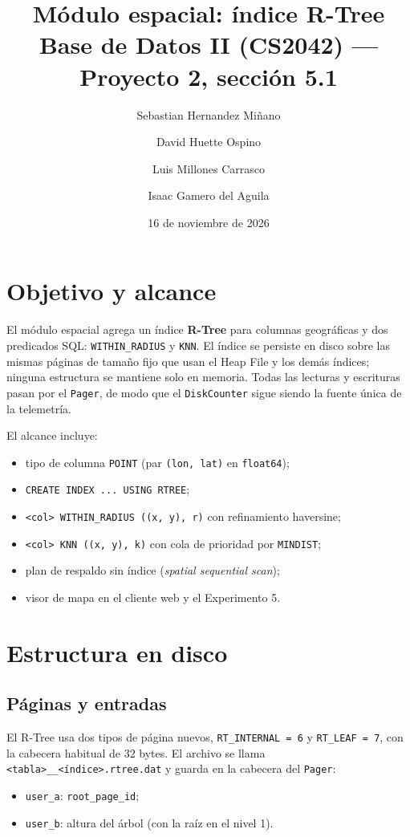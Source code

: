 \documentclass[11pt,a4paper]{article}
\title{Módulo espacial: índice R-Tree\\
\large Base de Datos II (CS2042) --- Proyecto 2, sección 5.1}
\author{Sebastian Hernandez Miñano \and David Huette Ospino \and
Luis Millones Carrasco \and Isaac Gamero del Aguila}
\date{16 de noviembre de 2026}
\newcommand{\code}[1]{\texttt{#1}}
\begin{document}
\maketitle

\section{Objetivo y alcance}

El módulo espacial agrega un índice \textbf{R-Tree} para columnas geográficas y dos
predicados SQL: \code{WITHIN\_RADIUS} y \code{KNN}. El índice se persiste en disco
sobre las mismas páginas de tamaño fijo que usan el Heap File y los demás índices;
ninguna estructura se mantiene solo en memoria. Todas las lecturas y escrituras
pasan por el \code{Pager}, de modo que el \code{DiskCounter} sigue siendo la fuente
única de la telemetría.

El alcance incluye:

\begin{itemize}
  \item tipo de columna \code{POINT} (par \code{(lon, lat)} en \code{float64});
  \item \code{CREATE INDEX ... USING RTREE};
  \item \code{<col> WITHIN\_RADIUS ((x, y), r)} con refinamiento haversine;
  \item \code{<col> KNN ((x, y), k)} con cola de prioridad por \code{MINDIST};
  \item plan de respaldo sin índice (\emph{spatial sequential scan});
  \item visor de mapa en el cliente web y el Experimento 5.
\end{itemize}

\section{Estructura en disco}

\subsection{Páginas y entradas}

El R-Tree usa dos tipos de página nuevos, \code{RT\_INTERNAL = 6} y
\code{RT\_LEAF = 7}, con la cabecera habitual de 32 bytes. El archivo se llama
\code{<tabla>\_\_<índice>.rtree.dat} y guarda en la cabecera del \code{Pager}:

\begin{itemize}
  \item \code{user\_a}: \code{root\_page\_id};
  \item \code{user\_b}: altura del árbol (con la raíz en el nivel 1).
\end{itemize}
\end{document}
